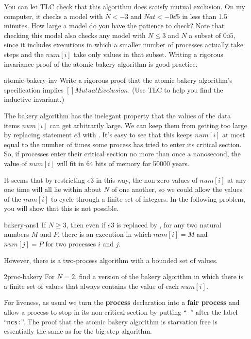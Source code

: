 \documentclass[fleqn,leqno]{article}
\begin{document}
You can let TLC check that this algorithm does satisfy mutual
exclusion.  On my computer, it checks a model with $N<-3$ and
$Nat<-0\dd5$ in less than 1.5 minutes.  How large a model do you have
the patience to check?  Note that checking this model also checks any
model with $N\leq 3$ and $N$ a subset of $0\dd 5$, since it includes
executions in which a smaller number of processes actually take steps
and the $num[i]$ take only values in that subset.  Writing a rigorous
invariance proof of the atomic bakery algorithm is good practice.

\begin{aproblem}{atomic-bakery-inv}
Write a rigorous proof that the atomic bakery algorithm's specification 
implies $[]MutualExclusion$.  (Use TLC to help you find the inductive
invariant.)
\end{aproblem}
%
The bakery algorithm has the inelegant property that the values of the
data items $num[i]$ can get arbitrarily large.  We can keep them from
getting too large by replacing statement $e3$ with
.  It's easy to see that this keeps $num[i]$
at most equal to the number of times some process has tried to enter
its critical section.  So, if processes enter their critical section
no more than once a nanosecond, the value of $num[i]$ will fit in 64
bits of memory for 50000 years.  

It seems that by restricting $e3$ in this way, the non-zero values of
$num[i]$ at any one time will all lie within about $N$ of one another,
so we could allow the values of the $num[i]$ to cycle through a finite
set of integers.  In the following problem, you will show that this is
not possible.

\begin{hproblem}{bakery-ans1}
If $N\geq3$, then even if $e3$ is replaced by ,
for any two natural numbers $M$ and $P$, there is an execution in which
$num[i]=M$ and $num[j]=P$ for two processes $i$ and $j$.
\end{hproblem}
%
However, there is a two-process algorithm with a bounded
set of values.
\begin{aproblem}{2proc-bakery}
For $N=2$, find a version of the bakery algorithm in which there
is a finite set of values that always contains the value of each
$num[i]$.
\end{aproblem}
%
%
For liveness, as usual we turn the \textbf{process} declaration into a
\textbf{fair process} and allow a process to stop in its
non-critical section by putting ``\texttt{-}'' after the label
``\texttt{ncs:}''.  The proof that the atomic bakery algorithm is
starvation free is essentially the same as for the big-step algorithm.
\end{document}
